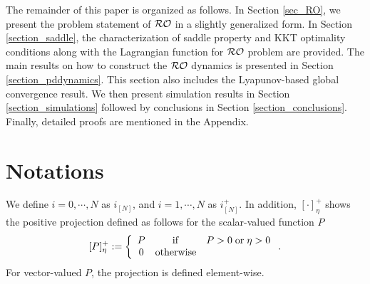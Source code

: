 \documentclass[journal,twoside,web]{ieeecolor}
\begin{document}
The remainder of this paper is organized as follows. In Section \ref{sec_RO}, we present the problem statement of ${\cal RO}$ in a slightly generalized form. In Section \ref{section_saddle}, the characterization of saddle property and KKT optimality conditions along with the Lagrangian function for ${\cal RO}$ problem are provided. The main results on how to construct the ${\cal RO}$ dynamics is presented in Section \ref{section_pddynamics}. This section also includes the Lyapunov-based global convergence result. We then present simulation results in Section \ref{section_simulations} followed by conclusions in Section \ref{section_conclusions}. %
Finally, detailed proofs are mentioned in the Appendix.

\section{Notations}\label{notations}

We define $i=0,\cdots,N$ as $i_{[N]}$, and $i=1,\cdots,N$ as $i^+_{[N]}$. In addition, $\left[\cdot\right]_\eta^+$ shows the positive projection defined as follows for the scalar-valued function $P$
\begin{align} \label{proj}
[P]_\eta^+:=\left\{\begin{array}{ccl}P&{\rm if}& P>0 \;{\rm or} \;\eta>0\\
0&{\rm otherwise}
\end{array}\right..
\end{align}
For vector-valued $P$, the projection is defined element-wise.
\end{document}
